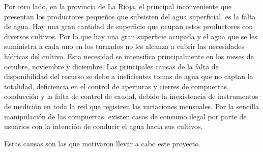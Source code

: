 Por otro lado, en la provincia de La Rioja, el principal inconveniente que presentan los productores pequeños que subsisten del agua superficial, es la falta de agua. Hay una gran cantidad de superficie que ocupan estos productores con diversos cultivos. Por lo que hay una gran superficie ocupada y el agua que se les suministra a cada uno en los turnados no les alcanza a cubrir las necesidades hídricas del cultivo. Esta necesidad se intensifica principalmente en los meses de octubre, noviembre y diciembre.
Las principales causas de la falta de disponibilidad del recurso se debe a ineficientes tomas de agua que no captan la totalidad, deficiencia en el control de aperturas y cierres de compuertas, conducción y la falta de control de caudal, debido  la inexistencia de instrumentos de medición en toda la red que registren las variaciones mensuales. Por la sencilla manipulación de las compuertas, existen casos de consumo ilegal por parte de usuarios con la intención de conducir el agua hacia sus cultivos.

Estas causas son las que motivaron llevar a cabo este proyecto.
%		
%
%
%
%

